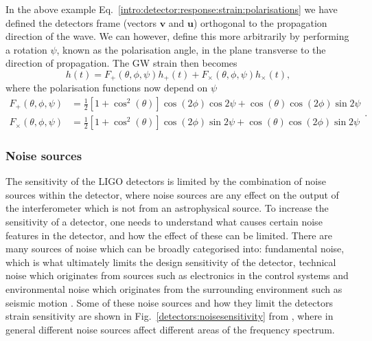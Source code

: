 In the above example Eq.~\ref{intro:detector:response:strain:polarisations} we have defined the detectors frame (vectors $\bm{v}$ and $\bm{u}$) orthogonal to the propagation direction of the wave. 
We can however, define this more arbitrarily by performing a rotation $\psi$, known as the polarisation angle, in the plane transverse to the direction of propagation.
The \gls{GW} strain then becomes
\begin{equation}
	\label{intro:detector:strain_2}
	h(t) = F_{+}(\theta,\phi, \psi)h_{+}(t) + F_{\times}(\theta,\phi,\psi)h_{\times}(t),
\end{equation}
where the polarisation functions now depend on $\psi$ \citep{maggioreGravitationalWaves}
\begin{equation}
\label{intro:detector:polarisationfuncs}
	\begin{split}
	F_{+}(\theta,\phi,\psi) &= \frac{1}{2} \left[ 1 + \cos^2 \left(\theta\right) \right] \cos\left(2\phi\right) \cos{2\psi} + \cos \left(\theta\right) \cos \left(2\phi \right) \sin{2\psi} \\
	F_{\times}(\theta,\phi,\psi) &= \frac{1}{2} \left[ 1 + \cos^2 \left(\theta\right) \right] \cos\left(2\phi\right) \sin{2\psi} + \cos \left(\theta\right) \cos \left(2\phi \right) \sin{2\psi}
	\end{split}.
\end{equation}




\subsubsection{\label{intro:detector:noise}Noise sources}

The sensitivity of the \gls{LIGO} detectors is limited by the combination of noise sources within the detector, where noise sources are any effect on the
output of the interferometer which is not from an astrophysical source.  
To increase the sensitivity of a detector, one needs to understand what causes certain noise features in the
detector, and how the effect of these can be limited.  
There are many sources of noise which can be broadly categorised into: fundamental noise, which is what ultimately limits the design sensitivity of the detector, technical noise which originates from sources such as electronics in the control systems and environmental noise which originates from the surrounding environment such as seismic motion \citep{martynov2016SensitivityAdvanced}.
Some of these noise sources and how they limit the detectors strain sensitivity
are shown in Fig.~\ref{detectors:noisesensitivity} from
\citep{aasi2015AdvancedLIGO}, where in general different noise sources affect different areas of the frequency spectrum.

